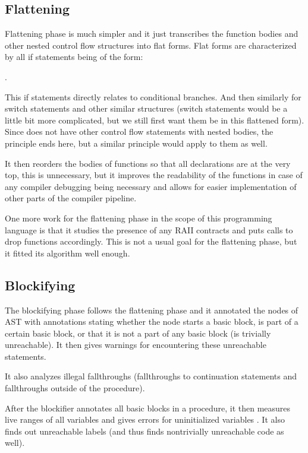 \subsection{Flattening}

Flattening phase is much simpler and it just transcribes the function bodies and other nested control flow structures into flat forms. Flat forms are characterized by all if statements being of the form:

.

This if statements directly relates to conditional branches. And then similarly for switch statements and other similar structures (switch statements would be a little bit more complicated, but we still first want them be in this flattened form). Since \cmm{} does not have other control flow statements with nested bodies, the principle ends here, but a similar principle would apply to them as well.

It then reorders the bodies of functions so that all declarations are at the very top, this is unnecessary, but it improves the readability of the functions in case of any compiler debugging being necessary and allows for easier implementation of other parts of the compiler pipeline.

One more work for the flattening phase in the scope of this programming language is that it studies the presence of any RAII contracts and puts calls to drop functions accordingly. This is not a usual goal for the flattening phase, but it fitted its algorithm well enough.

\subsection{Blockifying}

The blockifying phase follows the flattening phase and it annotated the nodes of AST with annotations stating whether the node starts a basic block, is part of a certain basic block, or that it is not a part of any basic block (is trivially unreachable). It then gives warnings for encountering these unreachable statements.

It also analyzes illegal fallthroughs (fallthroughs to continuation statements and fallthroughs outside of the procedure).



After the blockifier annotates all basic blocks in a procedure, it then measures live ranges of all variables and gives errors for uninitialized variables . It also finds out unreachable labels (and thus finds nontrivially unreachable code as well).

